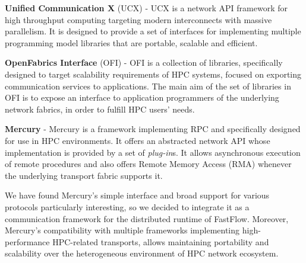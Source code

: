 \textbf{Unified Communication X} (UCX) - UCX \cite{ucx, ucx-website} is a network API framework for high throughput computing targeting modern interconnects with massive parallelism. It is designed to provide a set of interfaces for implementing multiple programming model libraries that are portable, scalable and efficient.\newline

\textbf{OpenFabrics Interface} (OFI) - OFI \cite{ofi, libfabric-website} is a collection of libraries, specifically designed to target scalability requirements of HPC systems, focused on exporting communication services to applications. The main aim of the set of libraries in OFI is to expose an interface to application programmers of the underlying network fabrics, in order to fulfill HPC users' needs.\newline

\textbf{Mercury} - Mercury \cite{mochi-core, mercury} is a framework implementing RPC and specifically designed for use in HPC environments. It offers an abstracted network API whose implementation is provided by a set of \textit{plug-in}s. It allows asynchronous execution of remote procedures and also offers Remote Memory Access (RMA) whenever the underlying transport fabric supports it.\newline

We have found Mercury's simple interface and broad support for various protocols particularly interesting, so we decided to integrate it as a communication framework for the distributed runtime of FastFlow. Moreover, Mercury's compatibility with multiple frameworks implementing high-performance HPC-related transports, allows maintaining portability and scalability over the heterogeneous environment of HPC network ecosystem. 